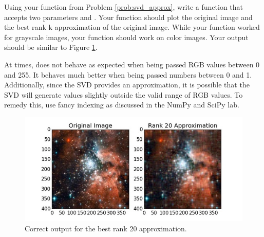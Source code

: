 \begin{problem}
Using your  function from Problem \ref{prob:svd_approx}, write a function  that accepts two parameters  and . Your function should plot the original image and the best rank k approximation of the original image. While your  function worked for grayscale images, your  function should work on color images. Your output should be similar to Figure \ref{fig:compressed_image}.

At times,  does not behave as expected when being passed RGB values between 0 and 255. It behaves much better when being passed numbers between 0 and 1. Additionally, since the SVD provides an approximation, it is possible that the SVD will generate values slightly outside the valid range of RGB values. To remedy this, use fancy indexing as discussed in the NumPy and SciPy lab. 

\begin{figure}[H]
\includegraphics[width=\textwidth]{compressed.jpg}
\caption{Correct output for the best rank 20 approximation.}
\label{fig:compressed_image}
\end{figure}
\end{problem}
